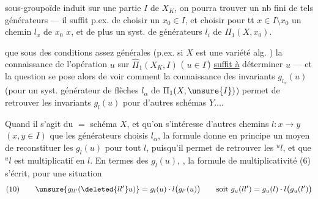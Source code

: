 sous-groupoïde induit sur une partie \uline{}  $I$ de $X_K$, on pourra trouver un nb fini de tels générateurs --- il suffit p.ex. de choisir un  $x_0\in I$, et choisir pour tt $x\in I\setminus x_0$ un chemin $l_x$ de $x_0$  $x$, et de plus un syst.  de générateurs $l_i$ de $\Pi_1(X,x_0)$.

 que sous des conditions assez générales (p.ex. si $X$ est une variété alg. ) la connaissance de l'opération $u$ sur $\widehat{\Pi}_1(X_K,I)$ ( $u\in\Gamma$) \uline{suffit à} déterminer $u$ --- et la question se pose alors de voir comment la connaissance des invariants  $g_{l_\alpha}(u)$ (pour un syst. générateur de flèches $l_\alpha$ de $\Pi_1(X,\unsure{I})$) permet de retrouver les invariants $g_l(u)$ pour d'autres schémas $Y\ldots$.

Quand il s'agit du $=$ schéma $X$, et qu'on s'intéresse  d'autres chemins $l:x\longrightarrow y$ $(x,y\in I)$ que les générateurs choisis $l_\alpha$, la formule donne en principe un moyen de reconstituer les $g_l(u)$ pour tout $l$, puisqu'il permet de retrouver les ${}^u l$, et que ${}^u l$ est multiplicatif en $l$. En termes des $g_l(u)$, , la formule de multiplicativité (6) s'écrit, pour une situation
\[
(10)\qquad \unsure{g_{ll'}(\deleted{ll'}u)}=g_l(u)\cdot l\bigl(g_{l'}(u)\bigr)
\qquad\text{soit }g_u(ll')=g_u(l)\cdot l\bigl(g_u(l')\bigr)
\]
